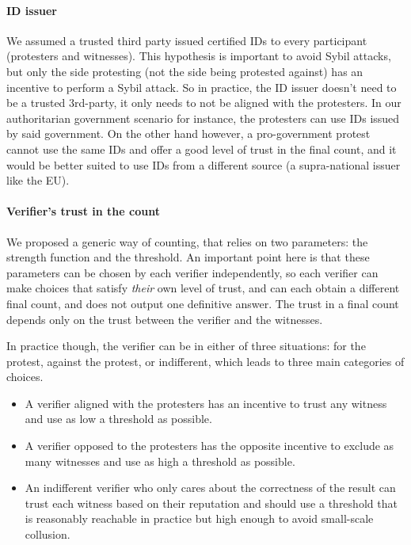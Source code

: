 \paragraph{ID issuer} We assumed a trusted third party issued certified IDs to every participant (protesters and witnesses). This hypothesis is important to avoid Sybil attacks,
but only the side protesting (not the side being protested against) has an incentive to perform a Sybil attack.
So in practice, the ID issuer doesn't need to be a trusted 3rd-party, it only needs to not be aligned with the protesters.
In our authoritarian government scenario for instance, the protesters can use IDs issued by said government.
On the other hand however, a pro-government protest cannot use the same IDs and offer a good level of trust in the final count, and it would be better suited to use IDs from a different source
(\eg a supra-national issuer like the EU).

 \paragraph{Verifier's trust in the count} We proposed a generic way of counting, that relies on two parameters: the strength function and the threshold.
An important point here is that these parameters can be chosen by each verifier independently, so each verifier can make choices that satisfy \emph{their} own level of trust, and can each obtain a different final count, and \CROCUS does not output one definitive answer. The trust in a final count depends only on the trust between the verifier and the witnesses.

In practice though, the verifier can be in either of three situations: for the protest, against the protest, or indifferent, which leads to three main categories of choices.
\begin{itemize}
	\item A verifier aligned with the protesters has an incentive to trust any witness and use as low a threshold as possible.
	\item A verifier opposed to the protesters has the opposite incentive to exclude as many witnesses and use as high a threshold as possible.
	\item An indifferent verifier who only cares about the correctness of the result can trust each witness based on their reputation and should use a threshold that is reasonably reachable in practice but high enough to avoid small-scale collusion.
\end{itemize}

